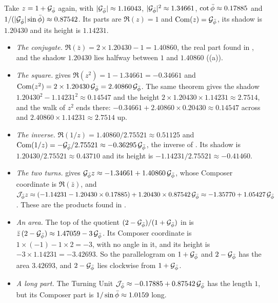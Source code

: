 \begin{workedexample}
Take $z = 1 + \mathcal{G}_{\bar{\phi}}$ again, with $|\mathcal{G}_{\bar{\phi}}| \approx 1.16043$, $|\mathcal{G}_{\bar{\phi}}|^2 \approx 1.34661$, $\cot\bar{\phi} \approx 0.17885$ and $1/(|\mathcal{G}_{\bar{\phi}}|\sin\bar{\phi}) \approx 0.87542$. Its parts are $\Re(z) = 1$ and $\operatorname{Com}(z) = \mathcal{G}_{\bar{\phi}}$, its shadow is $1.20430$ and its height is $1.14231$.
\begin{itemize}
  \item \emph{The conjugate.} $\Re(\bar{z}) = 2 \times 1.20430 - 1 = 1.40860$, the real part found in , and the shadow $1.20430$ lies halfway between $1$ and $1.40860$ ((a)).
  \item \emph{The square.}  gives $\Re(z^2) = 1 - 1.34661 = -0.34661$ and $\operatorname{Com}(z^2) = 2 \times 1.20430\,\mathcal{G}_{\bar{\phi}} = 2.40860\,\mathcal{G}_{\bar{\phi}}$. The same theorem gives the shadow $1.20430^2 - 1.14231^2 \approx 0.14547$ and the height $2 \times 1.20430 \times 1.14231 \approx 2.7514$, and the walk of $z^2$ ends there: $-0.34661 + 2.40860 \times 0.20430 \approx 0.14547$ across and $2.40860 \times 1.14231 \approx 2.7514$ up.
  \item \emph{The inverse.} $\Re(1/z) = 1.40860/2.75521 \approx 0.51125$ and $\operatorname{Com}(1/z) = -\mathcal{G}_{\bar{\phi}}/2.75521 \approx -0.36295\,\mathcal{G}_{\bar{\phi}}$, the inverse of . Its shadow is $1.20430/2.75521 \approx 0.43710$ and its height is $-1.14231/2.75521 \approx -0.41460$.
  \item \emph{The two turns.}  gives $\mathcal{G}_{\bar{\phi}} z \approx -1.34661 + 1.40860\,\mathcal{G}_{\bar{\phi}}$, whose Composer coordinate is $\Re(\bar{z})$, and $\mathcal{J}_{\bar{\phi}} z \approx (-1.14231 - 1.20430 \times 0.17885) + 1.20430 \times 0.87542\,\mathcal{G}_{\bar{\phi}} \approx -1.35770 + 1.05427\,\mathcal{G}_{\bar{\phi}}$. These are the products found in .
  \item \emph{An area.} The top of the quotient $(2 - \mathcal{G}_{\bar{\phi}})/(1 + \mathcal{G}_{\bar{\phi}})$ in  is $\bar{z}\,(2 - \mathcal{G}_{\bar{\phi}}) \approx 1.47059 - 3\,\mathcal{G}_{\bar{\phi}}$. Its Composer coordinate is $1 \times (-1) - 1 \times 2 = -3$, with no angle in it, and its height is $-3 \times 1.14231 = -3.42693$. So the parallelogram on $1 + \mathcal{G}_{\bar{\phi}}$ and $2 - \mathcal{G}_{\bar{\phi}}$ has the area $3.42693$, and $2 - \mathcal{G}_{\bar{\phi}}$ lies clockwise from $1 + \mathcal{G}_{\bar{\phi}}$.
  \item \emph{A long part.} The Turning Unit $\mathcal{J}_{\bar{\phi}} \approx -0.17885 + 0.87542\,\mathcal{G}_{\bar{\phi}}$ has the length $1$, but its Composer part is $1/\sin\bar{\phi} \approx 1.0159$ long.
\end{itemize}
\end{workedexample}

